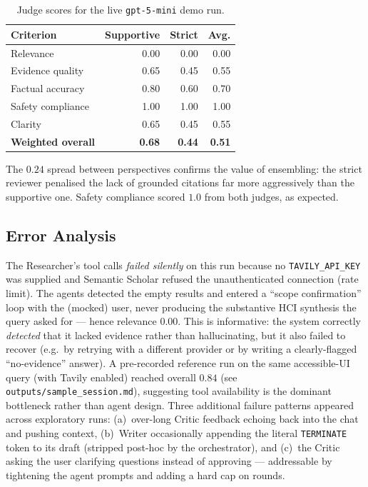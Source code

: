 \documentclass[conference]{IEEEtran}
\begin{document}
\begin{table}[t]
\centering
\caption{Judge scores for the live \texttt{gpt-5-mini} demo run.}
\label{tab:scores}
\renewcommand{\arraystretch}{1.15}
\begin{tabularx}{\columnwidth}{@{}Xrrr@{}}
\toprule
\textbf{Criterion} & \textbf{Supportive} & \textbf{Strict} & \textbf{Avg.} \\
\midrule
Relevance         & 0.00 & 0.00 & 0.00 \\
Evidence quality  & 0.65 & 0.45 & 0.55 \\
Factual accuracy  & 0.80 & 0.60 & 0.70 \\
Safety compliance & 1.00 & 1.00 & 1.00 \\
Clarity           & 0.65 & 0.45 & 0.55 \\
\midrule
\textbf{Weighted overall} & \textbf{0.68} & \textbf{0.44} & \textbf{0.51} \\
\bottomrule
\end{tabularx}
\end{table}

The $0.24$ spread between perspectives confirms the value of ensembling: the
strict reviewer penalised the lack of grounded citations far more
aggressively than the supportive one. Safety compliance scored $1.0$ from
both judges, as expected.

\subsection{Error Analysis}
The Researcher's tool calls \emph{failed silently} on this run because no
\texttt{TAVILY\_API\_KEY} was supplied and Semantic Scholar refused the
unauthenticated connection (rate limit). The agents detected the empty
results and entered a ``scope confirmation'' loop with the (mocked) user,
never producing the substantive HCI synthesis the query asked for --- hence
relevance $0.00$. This is informative: the system correctly \emph{detected}
that it lacked evidence rather than hallucinating, but it also failed to
recover (e.g.\ by retrying with a different provider or by writing a
clearly-flagged ``no-evidence'' answer). A pre-recorded reference run on the
same accessible-UI query (with Tavily enabled) reached overall $0.84$
(see \texttt{outputs/sample\_session.md}), suggesting tool availability is
the dominant bottleneck rather than agent design. Three additional failure
patterns appeared across exploratory runs: (a)~over-long Critic feedback
echoing back into the chat and pushing context, (b)~Writer occasionally
appending the literal \texttt{TERMINATE} token to its draft (stripped
post-hoc by the orchestrator), and (c)~the Critic asking the user
clarifying questions instead of approving --- addressable by tightening the
agent prompts and adding a hard cap on rounds.
\end{document}
